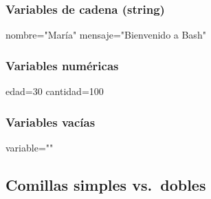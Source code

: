 \documentclass[
  spanish,
  12pt,
  letterpaper,
  DIV=11,
  numbers=noendperiod]{scrreprt}
\newenvironment{Shaded}{\begin{snugshade}}{\end{snugshade}}
\newcommand{\BuiltInTok}[1]{\textcolor[rgb]{0.00,0.23,0.31}{#1}}
\newcommand{\CommentTok}[1]{\textcolor[rgb]{0.37,0.37,0.37}{#1}}
\newcommand{\NormalTok}[1]{\textcolor[rgb]{0.00,0.23,0.31}{#1}}
\newcommand{\OperatorTok}[1]{\textcolor[rgb]{0.37,0.37,0.37}{#1}}
\newcommand{\StringTok}[1]{\textcolor[rgb]{0.13,0.47,0.30}{#1}}
\newcommand{\VariableTok}[1]{\textcolor[rgb]{0.07,0.07,0.07}{#1}}
\begin{document}
\subsubsection{Variables de cadena
(string)}\label{variables-de-cadena-string}

\begin{Shaded}
\begin{Highlighting}[]
\VariableTok{nombre}\OperatorTok{=}\StringTok{"María"}
\VariableTok{mensaje}\OperatorTok{=}\StringTok{"Bienvenido a Bash"}
\end{Highlighting}
\end{Shaded}

\subsubsection{Variables numéricas}\label{variables-numuxe9ricas}

\begin{Shaded}
\begin{Highlighting}[]
\VariableTok{edad}\OperatorTok{=}\NormalTok{30}
\VariableTok{cantidad}\OperatorTok{=}\NormalTok{100}
\end{Highlighting}
\end{Shaded}

\subsubsection{Variables vacías}\label{variables-vacuxedas}

\begin{Shaded}
\begin{Highlighting}[]
\VariableTok{variable}\OperatorTok{=}\StringTok{""}
\end{Highlighting}
\end{Shaded}

\subsection{Comillas simples
vs.~dobles}\label{comillas-simples-vs.-dobles}

\begin{Shaded}
\end{Shaded}
\end{document}
